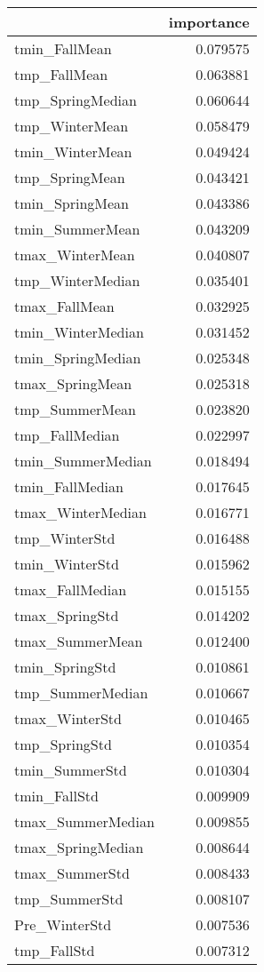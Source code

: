 \begin{tabular}{lr}
\toprule
 & importance \\
\midrule
tmin_FallMean & 0.079575 \\
tmp_FallMean & 0.063881 \\
tmp_SpringMedian & 0.060644 \\
tmp_WinterMean & 0.058479 \\
tmin_WinterMean & 0.049424 \\
tmp_SpringMean & 0.043421 \\
tmin_SpringMean & 0.043386 \\
tmin_SummerMean & 0.043209 \\
tmax_WinterMean & 0.040807 \\
tmp_WinterMedian & 0.035401 \\
tmax_FallMean & 0.032925 \\
tmin_WinterMedian & 0.031452 \\
tmin_SpringMedian & 0.025348 \\
tmax_SpringMean & 0.025318 \\
tmp_SummerMean & 0.023820 \\
tmp_FallMedian & 0.022997 \\
tmin_SummerMedian & 0.018494 \\
tmin_FallMedian & 0.017645 \\
tmax_WinterMedian & 0.016771 \\
tmp_WinterStd & 0.016488 \\
tmin_WinterStd & 0.015962 \\
tmax_FallMedian & 0.015155 \\
tmax_SpringStd & 0.014202 \\
tmax_SummerMean & 0.012400 \\
tmin_SpringStd & 0.010861 \\
tmp_SummerMedian & 0.010667 \\
tmax_WinterStd & 0.010465 \\
tmp_SpringStd & 0.010354 \\
tmin_SummerStd & 0.010304 \\
tmin_FallStd & 0.009909 \\
tmax_SummerMedian & 0.009855 \\
tmax_SpringMedian & 0.008644 \\
tmax_SummerStd & 0.008433 \\
tmp_SummerStd & 0.008107 \\
Pre_WinterStd & 0.007536 \\
tmp_FallStd & 0.007312 \\

\end{tabular}
